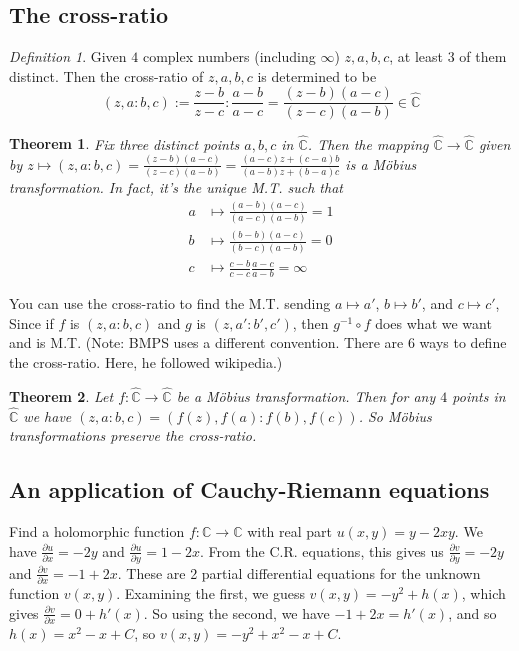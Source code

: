 \documentclass{article}
\theoremstyle{plain}
\newtheorem{theorem}{Theorem}
\theoremstyle{remark}
\newtheorem{definition}{Definition}
\newcommand{\C}{{\mathbb C}}
\begin{document}
\subsection{The cross-ratio}
\begin{definition}
	Given $4$ complex numbers (including $\infty$) $z,a,b,c$, at least $3$ of them distinct.
	Then the cross-ratio of $z,a,b,c$ is determined to be
	\[
		(z,a \colon b,c) := \frac{z-b}{z-c} \colon \frac{a-b}{a-c}
		= \frac{(z-b)(a-c)}{(z-c)(a-b)} \in \hat{\C}
	\]
\end{definition}
\begin{theorem}
	Fix three distinct points $a,b,c$ in $\hat{\C}$.
	Then the mapping $\hat{\C} \to \hat{\C}$ given by
	$z \mapsto (z,a \colon b,c) = \frac{(z-b)(a-c)}{(z-c)(a-b)}
	= \frac{(a-c)z + (c-a)b}{(a-b)z + (b-a)c}$
	is a M\"{o}bius transformation.
	In fact, it's the unique M.T. such that
	\begin{align*}
		a &\mapsto \frac{(a-b)(a-c)}{(a-c)(a-b)} = 1\\
		b &\mapsto \frac{(b-b)(a-c)}{(b-c)(a-b)} = 0\\
		c &\mapsto \frac{c-b}{c-c}\frac{a-c}{a-b} = \infty
	\end{align*}
\end{theorem}
You can use the cross-ratio to find the M.T. sending
$a \mapsto a'$, $b \mapsto b'$, and $c \mapsto c'$,
Since if $f$ is $(z,a\colon b,c)$ and $g$ is $(z,a'\colon b',c')$,
then $g^{-1}\circ f$ does what we want and is M.T.
(Note: BMPS uses a different convention.
There are $6$ ways to define the cross-ratio. Here, he followed wikipedia.)

\begin{theorem}
	Let $f \colon \hat{\C} \to \hat{\C}$ be a M\"{o}bius transformation.
	Then for any $4$ points in $\hat{\C}$ we have
	$(z,a \colon b,c) = (f(z),f(a) \colon f(b),f(c))$.
	So M\"{o}bius transformations preserve the cross-ratio.
\end{theorem}

\subsection{An application of Cauchy-Riemann equations}
Find a holomorphic function $f \colon \C \to \C$ with real part $u(x,y) = y - 2xy$.
We have $\frac{\partial u}{\partial x} = -2y$ and
$\frac{\partial u}{\partial y} = 1-2x$.
From the C.R. equations, this gives us $\frac{\partial v}{\partial y} = -2y$
and $\frac{\partial v}{\partial x} = -1 + 2x$.
These are 2 partial differential equations for the unknown function $v(x,y)$.
Examining the first, we guess $v(x,y) = -y^2 + h(x)$,
which gives $\frac{\partial v}{\partial x} = 0 + h'(x)$.
So using the second, we have $-1 + 2x = h'(x)$,
and so $h(x) = x^2 -x + C$,
so $v(x,y) = -y^2 + x^2 - x + C$.
\end{document}
